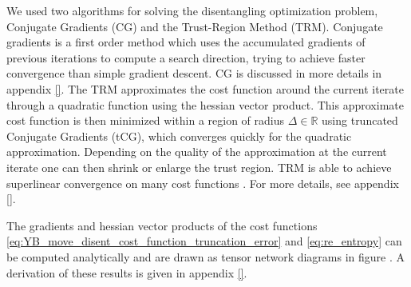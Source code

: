 We used two algorithms for solving the disentangling optimization problem, Conjugate Gradients (CG) and the Trust-Region Method (TRM). Conjugate gradients is a first order  method which uses the accumulated gradients of previous iterations to compute a search direction, trying to achieve faster convergence than simple gradient descent. CG is discussed in more details in appendix \ref{}. The TRM approximates the cost function around the current iterate through a quadratic function using the hessian vector product. This approximate cost function is then minimized within a region of radius $\Delta\in\mathbb{R}$ using truncated Conjugate Gradients (tCG), which converges quickly for the quadratic approximation. Depending on the quality of the approximation at the current iterate one can then shrink or enlarge the trust region. TRM is able to achieve superlinear convergence on many cost functions . For more details, see appendix \ref{}. \par
The gradients and hessian vector products of the cost functions \eqref{eq:YB_move_disent_cost_function_truncation_error} and \eqref{eq:re_entropy} can be computed analytically and are drawn as tensor network diagrams in figure \figref{}. A derivation of these results is given in appendix \ref{}.
